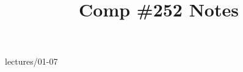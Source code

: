 \documentclass{scrartcl}
\title{Comp \#252 Notes}
\begin{document}
\maketitle

\clearpage
\tableofcontents



{lectures/01-07}
\end{document}
